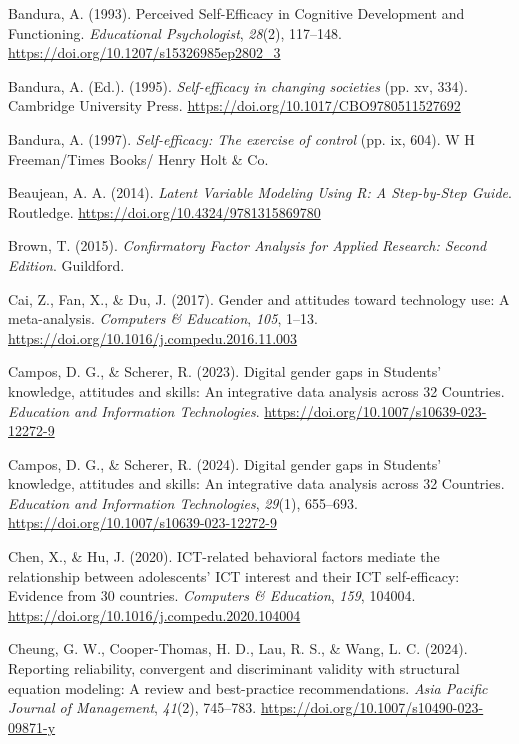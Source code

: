 \documentclass[
  letterpaper,
  DIV=11,
  numbers=noendperiod]{scrartcl}
\newlength{\cslhangindent}
\newenvironment{CSLReferences}[2] %
 {\begin{list}{}{%
  \setlength{\itemindent}{0pt}
  \setlength{\leftmargin}{0pt}
  \setlength{\parsep}{0pt}
  \ifodd #1
   \setlength{\leftmargin}{\cslhangindent}
   \setlength{\itemindent}{-1\cslhangindent}
  \fi
  \setlength{\itemsep}{#2\baselineskip}}}
 {\end{list}}
\begin{document}
\begin{CSLReferences}{1}{0}
Bandura, A. (1993). Perceived {Self-Efficacy} in {Cognitive Development}
and {Functioning}. \emph{Educational Psychologist}, \emph{28}(2),
117--148. \url{https://doi.org/10.1207/s15326985ep2802_3}

Bandura, A. (Ed.). (1995). \emph{Self-efficacy in changing societies}
(pp. xv, 334). Cambridge University Press.
\url{https://doi.org/10.1017/CBO9780511527692}

Bandura, A. (1997). \emph{Self-efficacy: {The} exercise of control} (pp.
ix, 604). W H Freeman/Times Books/ Henry Holt \& Co.

Beaujean, A. A. (2014). \emph{Latent {Variable Modeling Using R}: {A
Step-by-Step Guide}}. Routledge.
\url{https://doi.org/10.4324/9781315869780}

Brown, T. (2015). \emph{Confirmatory {Factor Analysis} for {Applied
Research}: {Second Edition}}. Guildford.

Cai, Z., Fan, X., \& Du, J. (2017). Gender and attitudes toward
technology use: {A} meta-analysis. \emph{Computers \& Education},
\emph{105}, 1--13. \url{https://doi.org/10.1016/j.compedu.2016.11.003}

Campos, D. G., \& Scherer, R. (2023). Digital gender gaps in {Students}'
knowledge, attitudes and skills: An integrative data analysis across 32
{Countries}. \emph{Education and Information Technologies}.
\url{https://doi.org/10.1007/s10639-023-12272-9}

Campos, D. G., \& Scherer, R. (2024). Digital gender gaps in {Students}'
knowledge, attitudes and skills: {An} integrative data analysis across
32 {Countries}. \emph{Education and Information Technologies},
\emph{29}(1), 655--693. \url{https://doi.org/10.1007/s10639-023-12272-9}

Chen, X., \& Hu, J. (2020). {ICT-related} behavioral factors mediate the
relationship between adolescents' {ICT} interest and their {ICT}
self-efficacy: {Evidence} from 30 countries. \emph{Computers \&
Education}, \emph{159}, 104004.
\url{https://doi.org/10.1016/j.compedu.2020.104004}

Cheung, G. W., Cooper-Thomas, H. D., Lau, R. S., \& Wang, L. C. (2024).
Reporting reliability, convergent and discriminant validity with
structural equation modeling: {A} review and best-practice
recommendations. \emph{Asia Pacific Journal of Management},
\emph{41}(2), 745--783. \url{https://doi.org/10.1007/s10490-023-09871-y}


\end{CSLReferences}
\end{document}
